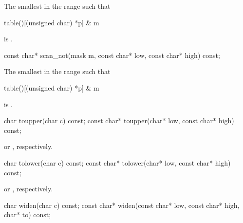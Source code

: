 \begin{itemdescr}
\pnum
\returns
The smallest
in the range
such that
\begin{codeblock}
table()[(unsigned char) *p] & m
\end{codeblock}
is
.
\end{itemdescr}

%
%
\begin{itemdecl}
const char* scan_not(mask m,
                     const char* low, const char* high) const;
\end{itemdecl}

\begin{itemdescr}
\pnum
\returns
The smallest
in the range
such that
\begin{codeblock}
table()[(unsigned char) *p] & m
\end{codeblock}
is
.
\end{itemdescr}

%
%
\begin{itemdecl}
char        toupper(char c) const;
const char* toupper(char* low, const char* high) const;
\end{itemdecl}

\begin{itemdescr}
\pnum
\returns
{}
or
,
respectively.
\end{itemdescr}

%
%
\begin{itemdecl}
char        tolower(char c) const;
const char* tolower(char* low, const char* high) const;
\end{itemdecl}

\begin{itemdescr}
\pnum
\returns
{}
or
,
respectively.
\end{itemdescr}

%
%
\begin{itemdecl}
char  widen(char c) const;
const char* widen(const char* low, const char* high,
    char* to) const;
\end{itemdecl}

